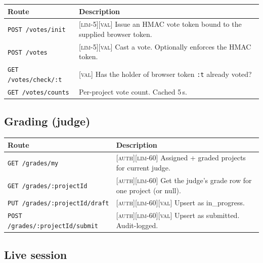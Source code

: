 \begin{longtable}{p{}p{}}
  \toprule
  \textbf{Route} & \textbf{Description} \\ \midrule
  \texttt{POST /votes/init}      & [\textsc{lim}-5][\textsc{val}] Issue an HMAC vote token bound to the supplied browser token. \\
  \texttt{POST /votes}           & [\textsc{lim}-5][\textsc{val}] Cast a vote. Optionally enforces the HMAC token. \\
  \texttt{GET  /votes/check/:t}  & [\textsc{val}] Has the holder of browser token \texttt{:t} already voted? \\
  \texttt{GET  /votes/counts}    & Per-project vote count. Cached 5\,s. \\
  \bottomrule
\end{longtable}

\subsection{Grading (judge)}

\begin{longtable}{p{}p{}}
  \toprule
  \textbf{Route} & \textbf{Description} \\ \midrule
  \texttt{GET  /grades/my}                & [\textsc{auth}][\textsc{lim}-60] Assigned + graded projects for current judge. \\
  \texttt{GET  /grades/:projectId}        & [\textsc{auth}][\textsc{lim}-60] Get the judge's grade row for one project (or null). \\
  \texttt{PUT  /grades/:projectId/draft}  & [\textsc{auth}][\textsc{lim}-60][\textsc{val}] Upsert as in\_progress. \\
  \texttt{POST /grades/:projectId/submit} & [\textsc{auth}][\textsc{lim}-60][\textsc{val}] Upsert as submitted. Audit-logged. \\
  \bottomrule
\end{longtable}

\subsection{Live session}

